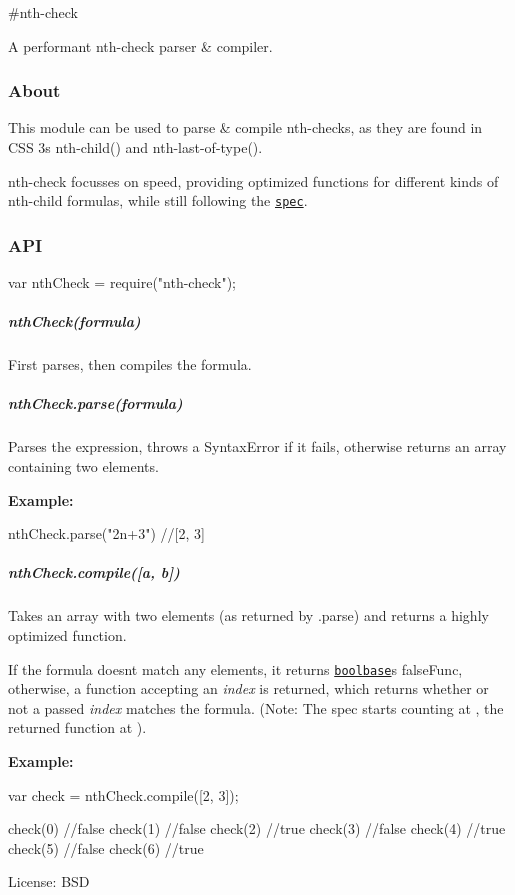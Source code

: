 \#nth-\/check \href{https://travis-ci.org/fb55/nth-check}{\tt }

A performant nth-\/check parser \& compiler.

\subsubsection*{About}

This module can be used to parse \& compile nth-\/checks, as they are found in C\+SS 3\textquotesingle{}s {\ttfamily nth-\/child()} and {\ttfamily nth-\/last-\/of-\/type()}.

{\ttfamily nth-\/check} focusses on speed, providing optimized functions for different kinds of nth-\/child formulas, while still following the \href{http://www.w3.org/TR/css3-selectors/#nth-child-pseudo}{\tt spec}.

\subsubsection*{A\+PI}


\begin{DoxyCode}
var nthCheck = require("nth-check");
\end{DoxyCode}


\subparagraph*{{\ttfamily nth\+Check(formula)}}

First parses, then compiles the formula.

\subparagraph*{{\ttfamily nth\+Check.\+parse(formula)}}

Parses the expression, throws a {\ttfamily Syntax\+Error} if it fails, otherwise returns an array containing two elements.

{\bfseries Example\+:}


\begin{DoxyCode}
nthCheck.parse("2n+3") //[2, 3]
\end{DoxyCode}


\subparagraph*{{\ttfamily nth\+Check.\+compile(\mbox{[}a, b\mbox{]})}}

Takes an array with two elements (as returned by {\ttfamily .parse}) and returns a highly optimized function.

If the formula doesn\textquotesingle{}t match any elements, it returns \href{https://github.com/fb55/boolbase}{\tt {\ttfamily boolbase}}\textquotesingle{}s {\ttfamily false\+Func}, otherwise, a function accepting an {\itshape index} is returned, which returns whether or not a passed {\itshape index} matches the formula. (Note\+: The spec starts counting at {}, the returned function at {}).

{\bfseries Example\+:} 
\begin{DoxyCode}
var check = nthCheck.compile([2, 3]);

check(0) //false
check(1) //false
check(2) //true
check(3) //false
check(4) //true
check(5) //false
check(6) //true
\end{DoxyCode}
 

 License\+: B\+SD 